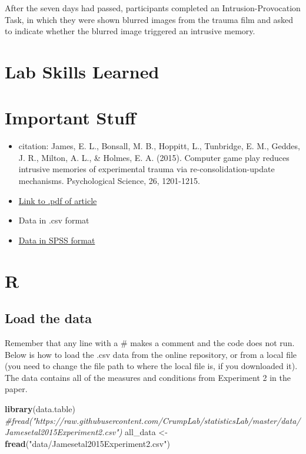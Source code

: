 \documentclass[]{book}
\newenvironment{Shaded}{\begin{snugshade}}{\end{snugshade}}
\newcommand{\KeywordTok}[1]{\textcolor[rgb]{0.13,0.29,0.53}{\textbf{#1}}}
\newcommand{\StringTok}[1]{\textcolor[rgb]{0.31,0.60,0.02}{#1}}
\newcommand{\CommentTok}[1]{\textcolor[rgb]{0.56,0.35,0.01}{\textit{#1}}}
\newcommand{\NormalTok}[1]{#1}
\providecommand{\tightlist}{%
  \setlength{\itemsep}{0pt}\setlength{\parskip}{0pt}}
\begin{document}
After the seven days had passed, participants completed an
Intrusion-Provocation Task, in which they were shown blurred images from
the trauma film and asked to indicate whether the blurred image
triggered an intrusive memory.

\section{Lab Skills Learned}\label{lab-skills-learned-2}

\section{Important Stuff}\label{important-stuff-2}

\begin{itemize}
\tightlist
\item
  citation: James, E. L., Bonsall, M. B., Hoppitt, L., Tunbridge, E. M.,
  Geddes, J. R., Milton, A. L., \& Holmes, E. A. (2015). Computer game
  play reduces intrusive memories of experimental trauma via
  re-consolidation-update mechanisms. Psychological Science, 26,
  1201-1215.
\item
  \href{http://journals.sagepub.com/stoken/default+domain/hQ2W4fbPrZVJ7eyNJaqu/full}{Link
  to .pdf of article}
\item
  Data in .csv format
\item
  \href{https://drive.google.com/file/d/0Bz-rhZ21ShvOZ1lvQ0dQekZGWU0/view?usp=sharing}{Data
  in SPSS format}
\end{itemize}

\section{R}\label{r-8}

\subsection{Load the data}\label{load-the-data-2}

Remember that any line with a \# makes a comment and the code does not
run. Below is how to load the .csv data from the online repository, or
from a local file (you need to change the file path to where the local
file is, if you downloaded it). The data contains all of the measures
and conditions from Experiment 2 in the paper.

\begin{Shaded}
\begin{Highlighting}[]
\KeywordTok{library}\NormalTok{(data.table)}
\CommentTok{#fread("https://raw.githubusercontent.com/CrumpLab/statisticsLab/master/data/Jamesetal2015Experiment2.csv")}
\NormalTok{all_data <-}\StringTok{ }\KeywordTok{fread}\NormalTok{(}\StringTok{"data/Jamesetal2015Experiment2.csv"}\NormalTok{)}
\end{Highlighting}
\end{Shaded}
\end{document}
